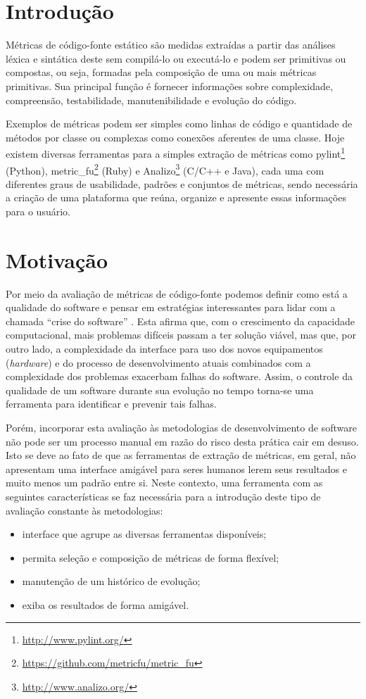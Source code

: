 \documentclass[12pt]{article}
\begin{document}
\section{Introdução} \label{sec:intro}
Métricas de código-fonte estático são medidas extraídas a partir das análises léxica e sintática deste sem compilá-lo ou executá-lo e podem ser primitivas ou compostas, ou seja, formadas pela composição de uma ou mais métricas primitivas. Sua principal função é fornecer informações sobre complexidade, compreensão, testabilidade, manutenibilidade e evolução do código\cite{m13}.

Exemplos de métricas podem ser simples como linhas de código e quantidade de métodos por classe ou complexas como conexões aferentes de uma classe.
Hoje existem diversas ferramentas para a simples extração de métricas como  pylint\footnote{\url{http://www.pylint.org/}} (Python), metric\_fu\footnote{\url{https://github.com/metricfu/metric_fu}} (Ruby) e Analizo\footnote{\url{http://www.analizo.org/}} (C/C++ e Java), cada uma com diferentes graus de usabilidade, padrões e conjuntos de métricas, sendo necessária a criação de uma plataforma que reúna, organize e apresente essas informações para o usuário.

\section{Motivação}\label{sec:motivacao}
Por meio da avaliação de métricas de código-fonte podemos definir como está a qualidade do software e pensar em estratégias interessantes para lidar com a chamada ``crise do software'' \cite{nr68}. Esta afirma que, com o crescimento da capacidade computacional, mais problemas difíceis passam a ter solução viável, mas que, por outro lado, a complexidade da interface para uso dos novos equipamentos (\textit{hardware}) e do processo de desenvolvimento atuais combinados com a complexidade dos problemas exacerbam falhas do software. Assim, o controle da qualidade de um software durante sua evolução no tempo torna-se uma ferramenta para identificar e prevenir tais falhas.

Porém, incorporar esta avaliação às metodologias de desenvolvimento de software não pode ser um processo manual em razão do risco desta prática cair em desuso. Isto se deve ao fato de que as ferramentas de extração de métricas, em geral, não apresentam uma interface amigável para seres humanos lerem seus resultados e muito menos um padrão entre si.
Neste contexto, uma ferramenta com as seguintes características se faz necessária para a introdução deste tipo de avaliação constante às metodologias:
\begin{itemize}
  \item interface que agrupe as diversas ferramentas disponíveis;
  \item permita seleção e composição de métricas de forma flexível;
  \item manutenção de um histórico de evolução;
  \item exiba os resultados de forma amigável.
\end{itemize}
\end{document}
